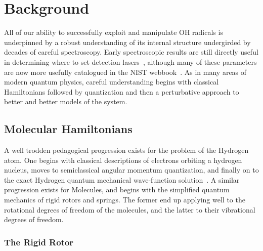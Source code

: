 \ifx\justbeingincluded\undefined


\fi

\chapter{Background}
\label{chapter:Background}

All of our ability to successfully exploit and manipulate OH radicals is underpinned by a robust understanding of its internal structure undergirded by decades of careful spectroscopy.
Early spectroscopic results are still directly useful in determining where to set detection lasers~\cite{Meerts1975}, although many of these parameters are now more usefully catalogued in the NIST webbook~\cite{Huber2018}.
As in many areas of modern quantum physics, careful understanding begins with classical Hamiltonians followed by quantization and then a perturbative approach to better and better models of the system. 

\section{Molecular Hamiltonians}

A well trodden pedagogical progression exists for the problem of the Hydrogen atom. 
One begins with classical descriptions of electrons orbiting a hydrogen nucleus, moves to semiclassical angular momentum quantization, and finally on to the exact Hydrogen quantum mechanical wave-function solution~\citep[Sec.~4.2]{Griffiths2018}. 
A similar progression exists for Molecules, and begins with the simplified quantum mechanics of rigid rotors and springs.
The former end up applying well to the rotational degrees of freedom of the molecules, and the latter to their vibrational degrees of freedom.

\subsection{The Rigid Rotor}

